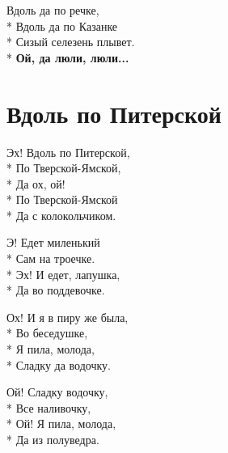 \medskip

\begin{minipage}{\linewidth}
Вдоль да по речке,\\*
Вдоль да по Казанке\\*
Сизый селезень плывет.\\*
\textbf{Ой, да люли, люли...}\\
\end{minipage}

\vspace{\fill}\newpage

\section{Вдоль по Питерской}
\label{song:Вдоль_по_Питерской}

\medskip

\begin{minipage}{\linewidth}
Эх! Вдоль по Питерской,\\*
По Тверской-Ямской,\\*
Да ох, ой!\\*
По Тверской-Ямской\\*
Да с колокольчиком.\\
\end{minipage}\par\medskip\nobreak

\medskip

\begin{minipage}{\linewidth}
Э! Едет миленький\\*
Сам на троечке.\\*
Эх! И едет, лапушка,\\*
Да во поддевочке.\\
\end{minipage}\par\medskip\nobreak

\medskip

\begin{minipage}{\linewidth}
Ох! И я в пиру же была,\\*
Во беседушке,\\*
Я пила, молода,\\*
Сладку да водочку.\\
\end{minipage}\par\medskip\nobreak

\medskip

\begin{minipage}{\linewidth}
Ой! Сладку водочку,\\*
Все наливочку,\\*
Ой! Я пила, молода,\\*
Да из полуведра.\\
\end{minipage}\par\medskip\nobreak

